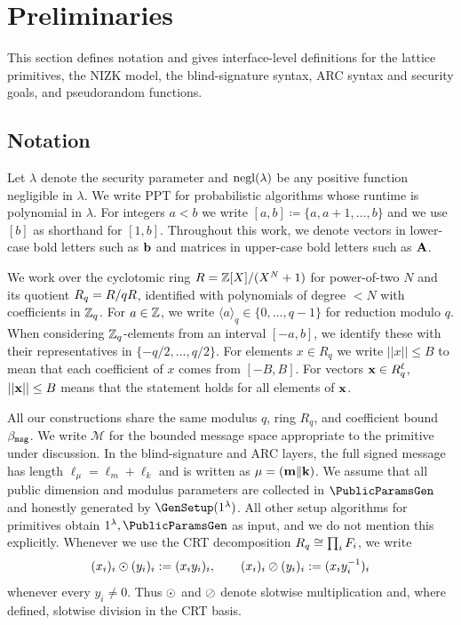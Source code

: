 \section{Preliminaries}
\label{sec:preliminaries}

This section defines notation and gives interface-level definitions for the lattice primitives, the NIZK model, the
blind-signature syntax, ARC syntax and security goals, and pseudorandom functions.



\subsection{Notation}
Let $\lambda$ denote the security parameter and  \(\mathrm{negl}(\lambda)\) be any positive function negligible in  \(\lambda\). We write PPT for
probabilistic algorithms whose runtime is polynomial in \(\lambda\). For integers \(a<b\) we write
\([a,b]\coloneqq\{a,a+1,\ldots,b\}\) and we use \([b]\) as shorthand for \([1,b]\). Throughout this work, we denote vectors in lower-case bold letters such as $\mathbf{b}$ and matrices in upper-case bold letters such as $\mathbf{A}$.

We work over the cyclotomic ring \(R=\mathbb{Z}[X]/(X^N+1)\) for power-of-two \(N\) and its quotient \(R_q=R/qR\), identified
with polynomials of degree \(<N\) with coefficients in \(\mathbb{Z}_q\). For \(a\in\mathbb{Z}\), we write \(\langle a\rangle_q\in\{0,\dots,q-1\}\)
for reduction modulo \(q\). When considering $\mathbb{Z}_q$-elements from an interval \([-a,b]\), we identify these with their representatives in \(\{-q/2,\dots,q/2\}\).
For elements $x\in R_q$ we write $||x||\leq B$ to mean that each coefficient of $x$ comes from $[-B,B]$. For vectors $\mathbf{x}\in R_q^\ell$, $||\mathbf{x}||\leq B$ means that the statement holds for all elements of $\mathbf{x}$.

All our constructions share the same modulus $q$, ring $R_q$, and coefficient bound \(\beta_{\mathtt{msg}}\). We write
\(\mathcal{M}\) for the bounded message space appropriate to the primitive under discussion. In the blind-signature and
ARC layers, the full signed message has length \(\ell_\mu=\ell_m+\ell_k\) and is written as
\(\mathbf{\mu}=(\mathbf{m}\Vert \mathbf{k})\). We assume that all public dimension and modulus parameters are collected in
\(\PublicParamsGen\) and honestly generated by \(\GenSetup(1^\lambda)\). All other setup algorithms for primitives obtain
\(1^\lambda,\PublicParamsGen\) as input, and we do not mention this explicitly.
Whenever we use the CRT decomposition \(R_q\cong \prod_i F_i\), we write
\[
(x_i)_i \odot (y_i)_i := (x_i y_i)_i,
\qquad
(x_i)_i \oslash (y_i)_i := (x_i y_i^{-1})_i
\]
whenever every \(y_i\neq 0\). Thus \(\odot\) and \(\oslash\) denote slotwise multiplication and, where defined, slotwise
division in the CRT basis.


